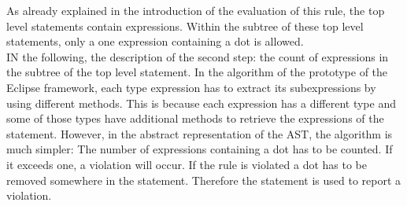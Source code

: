 As already explained in the introduction of the evaluation of this rule, the top level statements contain expressions. Within the subtree of these top level statements, only a one expression containing a dot is allowed.
\\

IN the following, the description of the second step: the count of expressions in the subtree of the top level statement. In the algorithm of the prototype of the Eclipse framework, each type expression has to extract its subexpressions by using different methods. This is because each expression has a different type and some of those types have additional methods to retrieve the expressions of the statement. However, in the abstract representation of the \acf{AST}, the algorithm is much simpler: The number of expressions containing a dot has to be counted. If it exceeds one, a violation will occur. If the rule is violated a dot has to be removed somewhere in the statement. Therefore the statement is used to report a violation.
\\

